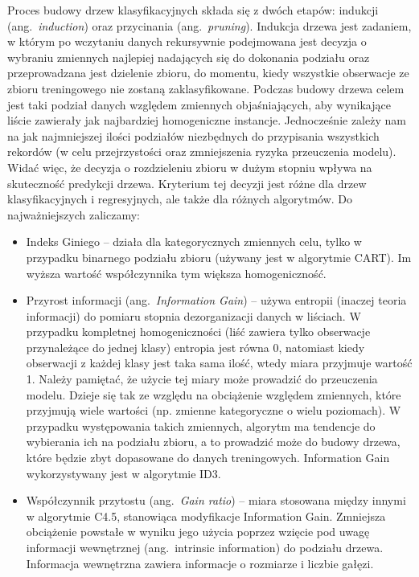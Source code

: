 \documentclass[12pt,a4paper,twoside,openany]{book}
\begin{document}
Proces budowy drzew klasyfikacyjnych składa się z dwóch etapów: indukcji (ang.~\textit{induction}) oraz przycinania (ang.~\textit{pruning}). Indukcja drzewa jest zadaniem, w którym po wczytaniu danych rekursywnie podejmowana jest decyzja o wybraniu zmiennych najlepiej nadających się do dokonania podziału oraz przeprowadzana jest dzielenie zbioru, do momentu, kiedy wszystkie obserwacje ze zbioru treningowego nie zostaną zaklasyfikowane. Podczas budowy drzewa celem jest taki podział danych względem zmiennych objaśniających, aby wynikające liście zawierały jak najbardziej homogeniczne instancje. Jednocześnie zależy nam na jak najmniejszej ilości podziałów niezbędnych do przypisania wszystkich rekordów (w celu przejrzystości oraz zmniejszenia ryzyka przeuczenia modelu). Widać więc, że decyzja o rozdzieleniu zbioru w dużym stopniu wpływa na skuteczność predykcji drzewa. Kryterium tej decyzji jest różne dla drzew klasyfikacyjnych i regresyjnych, ale także dla różnych algorytmów. Do najważniejszych zaliczamy:
\begin{itemize}
\item Indeks Giniego – działa dla kategorycznych zmiennych celu, tylko w przypadku binarnego podziału zbioru (używany jest w algorytmie CART). Im wyższa wartość współczynnika tym większa homogeniczność.
\item Przyrost informacji (ang.~\textit{Information Gain}) – używa entropii (inaczej teoria informacji) do pomiaru stopnia dezorganizacji danych w liściach. W przypadku kompletnej homogeniczności (liść zawiera tylko obserwacje przynależące do jednej klasy) entropia jest równa 0, natomiast kiedy obserwacji z każdej klasy jest taka sama ilość, wtedy miara przyjmuje wartość 1. Należy pamiętać, że użycie tej miary może prowadzić do przeuczenia modelu. Dzieje się tak ze względu na obciążenie względem zmiennych, które przyjmują wiele wartości (np. zmienne kategoryczne o wielu poziomach). W przypadku występowania takich zmiennych, algorytm ma tendencje do wybierania ich na podziału zbioru, a to prowadzić może do budowy drzewa, które będzie zbyt dopasowane do danych treningowych. Information Gain wykorzystywany jest w algorytmie ID3.
\item Współczynnik przytostu (ang.~\textit{Gain ratio}) – miara stosowana między innymi w algorytmie C4.5, stanowiąca modyfikacje Information Gain. Zmniejsza obciążenie powstałe w wyniku jego użycia poprzez wzięcie pod uwagę informacji wewnętrznej (ang.~intrinsic information) do podziału drzewa. Informacja wewnętrzna zawiera informacje o rozmiarze i liczbie gałęzi.
\end{itemize}
\end{document}
